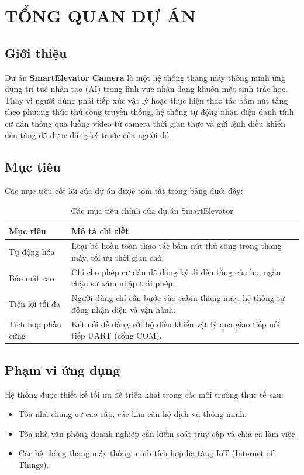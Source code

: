 \documentclass[12pt,a4paper]{article}
\begin{document}

\section{TỔNG QUAN DỰ ÁN}

\subsection{Giới thiệu}
Dự án \textbf{SmartElevator Camera} là một hệ thống thang máy thông minh ứng dụng trí tuệ nhân tạo (AI) trong lĩnh vực nhận dạng khuôn mặt sinh trắc học. Thay vì người dùng phải tiếp xúc vật lý hoặc thực hiện thao tác bấm nút tầng theo phương thức thủ công truyền thống, hệ thống tự động nhận diện danh tính cư dân thông qua luồng video từ camera thời gian thực và gửi lệnh điều khiển đến tầng đã được đăng ký trước của người đó.

\subsection{Mục tiêu}
Các mục tiêu cốt lõi của dự án được tóm tắt trong bảng dưới đây:
\begin{table}[H]
    \centering
    \begin{tabular}{|l|p{11cm}|}
        \hline
        \textbf{Mục tiêu} & \textbf{Mô tả chi tiết} \\ \hline
        Tự động hóa & Loại bỏ hoàn toàn thao tác bấm nút thủ công trong thang máy, tối ưu thời gian chờ. \\ \hline
        Bảo mật cao & Chỉ cho phép cư dân đã đăng ký đi đến tầng của họ, ngăn chặn sự xâm nhập trái phép. \\ \hline
        Tiện lợi tối đa & Người dùng chỉ cần bước vào cabin thang máy, hệ thống tự động nhận diện và vận hành. \\ \hline
        Tích hợp phần cứng & Kết nối dễ dàng với bộ điều khiển vật lý qua giao tiếp nối tiếp UART (cổng COM). \\ \hline
    \end{tabular}
    \caption{Các mục tiêu chính của dự án SmartElevator}
    \label{tab:objectives}
\end{table}

\subsection{Phạm vi ứng dụng}
Hệ thống được thiết kế tối ưu để triển khai trong các môi trường thực tế sau:
\begin{itemize}
    \item Tòa nhà chung cư cao cấp, các khu căn hộ dịch vụ thông minh.
    \item Tòa nhà văn phòng doanh nghiệp cần kiểm soát truy cập và chia ca làm việc.
    \item Các hệ thống thang máy thông minh tích hợp hạ tầng IoT (Internet of Things).
\end{itemize}
\end{document}
